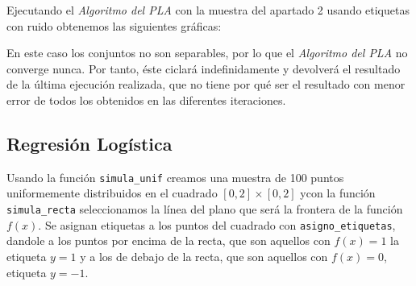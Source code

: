 \documentclass{article}
\begin{document}
Ejecutando el \textit{Algoritmo del PLA} con la muestra del apartado  2 usando etiquetas con ruido obtenemos las siguientes gráficas:

\begin{figure}[H]
  \centering
\end{figure}

En este caso los conjuntos no son separables, por lo que el \textit{Algoritmo del PLA} no converge nunca. Por tanto, éste ciclará indefinidamente y devolverá el resultado de la última ejecución realizada, que no tiene por qué ser el resultado con menor error de todos los obtenidos en las diferentes iteraciones. 

\subsection{Regresión Logística}

Usando la función \texttt{simula\_unif} creamos una muestra de 100 puntos uniformemente distribuidos en el cuadrado $[0,2] \times [0,2]$ ycon la función \texttt{simula\_recta} seleccionamos la línea del plano que será la frontera de la función $f(x)$. Se asignan etiquetas a los puntos del cuadrado con \texttt{asigno\_etiquetas}, dandole a los puntos por encima de la recta, que son aquellos con $f(x)=1$ la etiqueta $y=1$ y a los de debajo de la recta, que son aquellos con $f(x)=0$, etiqueta $y=-1$.
\end{document}
